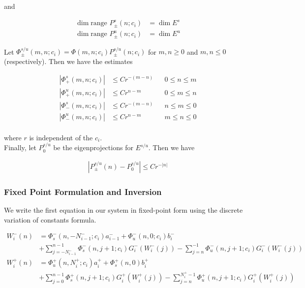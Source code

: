 \documentclass[12pt]{article}
\begin{document}
and

\begin{align*}
\dim \text{range }P_\pm^s(n; c_i) &= \dim E^s \\
\dim \text{range }P_\pm^u(n; c_i) &= \dim E^u
\end{align*}

Let $\Phi_\pm^{s/u}(m, n; c_i) = \Phi(m, n; c_i) P_\pm^{s/u}(n; c_i)$ for $m, n \geq 0$ and $m, n \leq 0$ (respectively). Then we have the estimates

\begin{align*}
|\Phi_+^s(m, n; c_i)| &\leq C r^{-(m - n)} && 0 \leq n \leq m \\
|\Phi_+^u(m, n; c_i)| &\leq C r^{n-m} && 0 \leq m \leq n \\
|\Phi_-^s(m, n; c_i)| &\leq C r^{-(m - n)} && n \leq m \leq 0 \\
|\Phi_-^u(m, n; c_i)| &\leq C r^{n-m} && m \leq n \leq 0\\
\end{align*}

where $r$ is independent of the $c_i$.\\

Finally, let $P_0^{s/u}$ be the eigenprojections for $E^{s/u}$. Then we have

\begin{align}\label{projbound}
| P_\pm^{s/u}(n) - P_0^{s/u} | \leq C r^{-|n|}
\end{align}

\subsubsection{Fixed Point Formulation and Inversion}

We write the first equation in our system in fixed-point form using the discrete variation of constants formula.

\begin{align*}
W_i^-(n) &= 
\Phi_s^-(n, -N_{i-1}^-; c_i) a_{i-1}^- + \Phi_u^-(n, 0; c_i) b_i^-  \\
&+ \sum_{j = -N_{i-1}^-}^{n-1} \Phi_s^-(n, j+1; c_i) G_i^-(W_i^-(j)) - \sum_{j = n}^{-1} \Phi_u^-(n, j+1; c_i) G_i^-(W_i^-(j)) \\
W_i^+(n) &= \Phi_u^+(n, N_i^+; c_i) a_i^+ + \Phi_s^+(n, 0) b_i^+ \\
&+ \sum_{j = 0}^{n-1} \Phi_s^+(n, j+1; c_i) G_i^+(W_i^+(j)) 
- \sum_{j = n}^{N_i^+-1} \Phi_u^+(n, j+1; c_i) G_i^+(W_i^+(j))
\end{align*}
\end{document}

